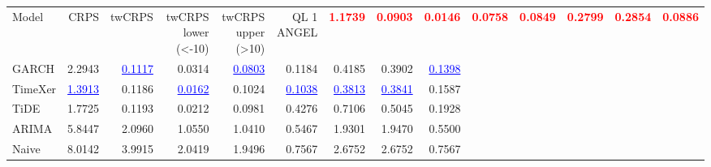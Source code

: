 \begin{tabular}{lrrrrrrrr}
\toprule
Model & CRPS & twCRPS & twCRPS lower (<-10) & twCRPS upper (>10) & QL 1%
\midrule
ANGEL & \textcolor{red}{\textbf{1.1739}} & \textcolor{red}{\textbf{0.0903}} & \textcolor{red}{\textbf{0.0146}} & \textcolor{red}{\textbf{0.0758}} & \textcolor{red}{\textbf{0.0849}} & \textcolor{red}{\textbf{0.2799}} & \textcolor{red}{\textbf{0.2854}} & \textcolor{red}{\textbf{0.0886}} \\
GARCH & 2.2943 & \textcolor{blue}{\underline{0.1117}} & 0.0314 & \textcolor{blue}{\underline{0.0803}} & 0.1184 & 0.4185 & 0.3902 & \textcolor{blue}{\underline{0.1398}} \\
TimeXer & \textcolor{blue}{\underline{1.3913}} & 0.1186 & \textcolor{blue}{\underline{0.0162}} & 0.1024 & \textcolor{blue}{\underline{0.1038}} & \textcolor{blue}{\underline{0.3813}} & \textcolor{blue}{\underline{0.3841}} & 0.1587 \\
TiDE & 1.7725 & 0.1193 & 0.0212 & 0.0981 & 0.4276 & 0.7106 & 0.5045 & 0.1928 \\
ARIMA & 5.8447 & 2.0960 & 1.0550 & 1.0410 & 0.5467 & 1.9301 & 1.9470 & 0.5500 \\
Naive & 8.0142 & 3.9915 & 2.0419 & 1.9496 & 0.7567 & 2.6752 & 2.6752 & 0.7567 \\
\bottomrule
\end{tabular}
